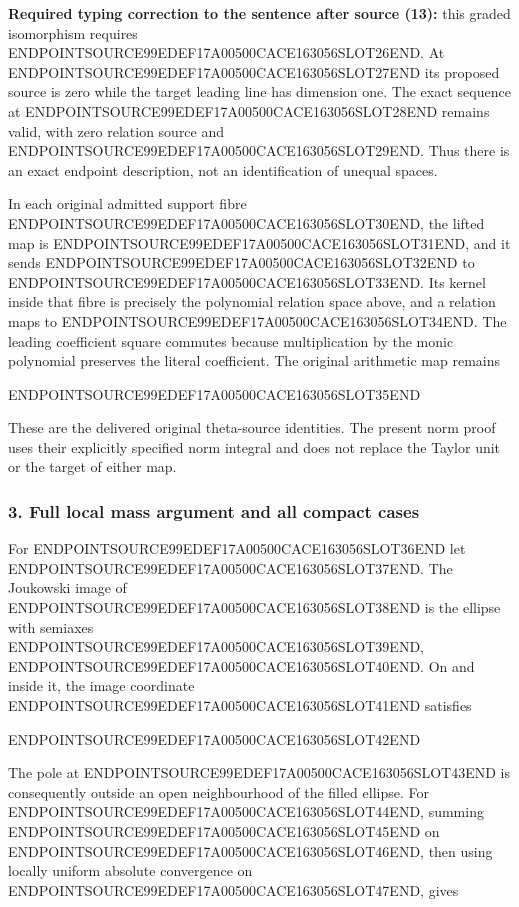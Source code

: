 \textbf{Required typing correction to the sentence after source (13):} this graded isomorphism requires ENDPOINTSOURCE99EDEF17A00500CACE163056SLOT26END. At ENDPOINTSOURCE99EDEF17A00500CACE163056SLOT27END its proposed source is zero while the target leading line has dimension one. The exact sequence at ENDPOINTSOURCE99EDEF17A00500CACE163056SLOT28END remains valid, with zero relation source and ENDPOINTSOURCE99EDEF17A00500CACE163056SLOT29END. Thus there is an exact endpoint description, not an identification of unequal spaces.

In each original admitted support fibre ENDPOINTSOURCE99EDEF17A00500CACE163056SLOT30END, the lifted map is ENDPOINTSOURCE99EDEF17A00500CACE163056SLOT31END, and it sends ENDPOINTSOURCE99EDEF17A00500CACE163056SLOT32END to ENDPOINTSOURCE99EDEF17A00500CACE163056SLOT33END. Its kernel inside that fibre is precisely the polynomial relation space above, and a relation maps to ENDPOINTSOURCE99EDEF17A00500CACE163056SLOT34END. The leading coefficient square commutes because multiplication by the monic polynomial preserves the literal coefficient. The original arithmetic map remains

ENDPOINTSOURCE99EDEF17A00500CACE163056SLOT35END

These are the delivered original theta-source identities. The present norm proof uses their explicitly specified norm integral and does not replace the Taylor unit or the target of either map.

\subsubsection{3. Full local mass argument and all compact cases}\label{endpoint-arithmetic_intake--full-local-mass-argument-and-all-compact-cases}

For ENDPOINTSOURCE99EDEF17A00500CACE163056SLOT36END let ENDPOINTSOURCE99EDEF17A00500CACE163056SLOT37END. The Joukowski image of ENDPOINTSOURCE99EDEF17A00500CACE163056SLOT38END is the ellipse with semiaxes ENDPOINTSOURCE99EDEF17A00500CACE163056SLOT39END, ENDPOINTSOURCE99EDEF17A00500CACE163056SLOT40END. On and inside it, the image coordinate ENDPOINTSOURCE99EDEF17A00500CACE163056SLOT41END satisfies

ENDPOINTSOURCE99EDEF17A00500CACE163056SLOT42END

The pole at ENDPOINTSOURCE99EDEF17A00500CACE163056SLOT43END is consequently outside an open neighbourhood of the filled ellipse. For ENDPOINTSOURCE99EDEF17A00500CACE163056SLOT44END, summing ENDPOINTSOURCE99EDEF17A00500CACE163056SLOT45END on ENDPOINTSOURCE99EDEF17A00500CACE163056SLOT46END, then using locally uniform absolute convergence on ENDPOINTSOURCE99EDEF17A00500CACE163056SLOT47END, gives

